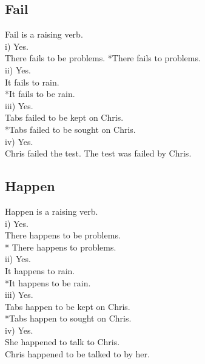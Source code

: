 \documentclass{article}
\begin{document}
\subsection{Fail}
Fail is a raising verb. \\
i) Yes. \\ There fails to be problems. *There fails to problems. \\
ii) Yes. \\ It fails to rain.\\ *It fails to be rain. \\
iii) Yes. \\ Tabs failed to be kept on Chris. \\ *Tabs failed to be sought on Chris. \\
iv) Yes. \\ Chris failed the test. The test was failed by Chris. \\
\subsection{Happen}
Happen is a raising verb. \\
i) Yes. \\ There happens to be problems.\\ * There happens to problems. \\
ii) Yes. \\ It happens to rain. \\ *It happens to be rain. \\
iii) Yes. \\ Tabs happen to be kept on Chris. \\ *Tabs happen to sought on Chris. \\
iv) Yes. \\ She happened to talk to Chris. \\ Chris happened to be talked to by her. 
\end{document}
